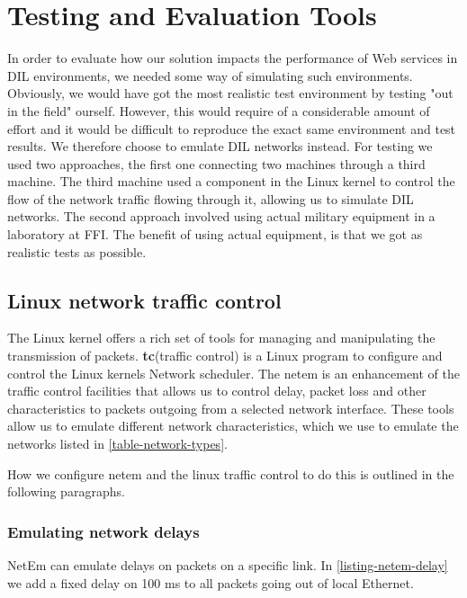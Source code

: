 \section{Testing and Evaluation Tools}

In order to evaluate how our solution impacts the performance of Web services in
DIL environments, we needed some way of simulating such environments. Obviously,
we would have got the most realistic test environment by testing "out in the
field" ourself. However, this would require of a considerable amount of effort
and it would be difficult to reproduce the exact same environment and test
results. We therefore choose to emulate DIL networks instead. For testing we used
two approaches, the first one connecting two machines through a third machine.
The third machine used a component in the Linux kernel to control the flow
of the network traffic flowing through it, allowing us to simulate DIL networks.
The second approach involved using actual military equipment in a laboratory at
FFI. The benefit of using actual equipment, is that we got as realistic tests as
possible.


\subsection{Linux network traffic control}

The Linux kernel offers a rich set of tools for managing and manipulating the
transmission of packets. \textbf{tc}(traffic control) is a Linux program to
configure and control the Linux kernels Network scheduler. The \gls{netem} is an
enhancement of the traffic control facilities that allows us to control delay,
packet loss and other characteristics to packets outgoing from a selected
network interface\cite{man-netem}. These tools allow us to emulate different
network characteristics, which we use to emulate the networks listed in
\cref{table-network-types}.

How we configure \gls{netem} and the linux traffic control to do this is
outlined in the following paragraphs.


\subsubsection{Emulating network delays}

NetEm can emulate delays on packets on a specific link. In
\cref{listing-netem-delay} we add a fixed delay on 100 ms to all packets going
out of local Ethernet.

